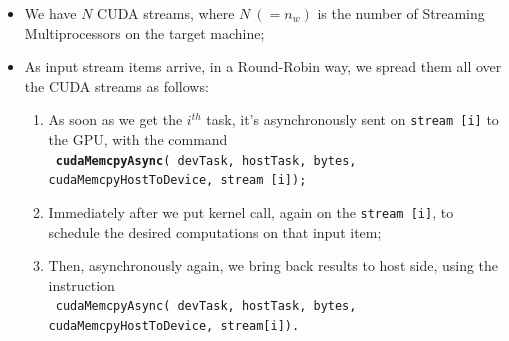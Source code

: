 	\begin{itemize}
		\item We have \(N\) CUDA streams, where \(N\  (=n_w)\) is the number of Streaming Multiprocessors on the target machine;
		\item As input stream items arrive, in a Round-Robin way, we spread them all over the CUDA streams as follows:
		\begin{enumerate}
			\item As soon as we get the \(i^{th}\) task, it's asynchronously sent on \texttt{stream [i]} to the GPU, with the command \\ 
			\texttt{ \textbf{cudaMemcpyAsync}( devTask, hostTask, bytes, cudaMemcpyHostToDevice, \tab \tab \tab \tab stream [i]);}
			
			\item Immediately after we put kernel call, again on the \texttt{stream [i]}, to schedule the desired computations on that input item;
			
			\item Then, asynchronously again, we bring back results to host side, using the instruction \\
			\texttt{ cudaMemcpyAsync( devTask, hostTask, bytes, cudaMemcpyHostToDevice, \tab \tab \tab \tab stream[i]).}
			
		\end{enumerate}
	\end{itemize}

